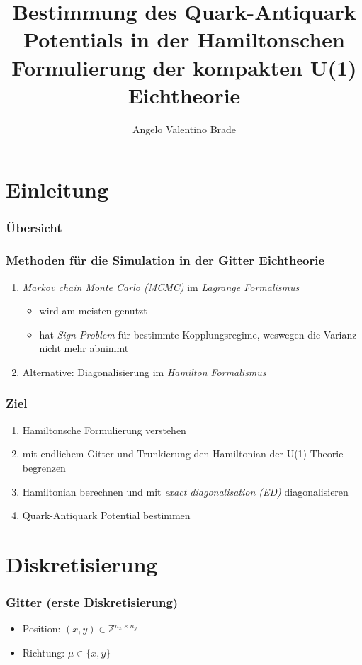 \documentclass{beamer}
\title{Bestimmung des Quark-Antiquark Potentials in der Hamiltonschen Formulierung der kompakten U(1) Eichtheorie}
\author{Angelo Valentino Brade} %
\begin{document}
\begin{frame}
	\titlepage
\end{frame}
\section{Einleitung}
\begin{frame}
	\frametitle{Übersicht}
	\begin{figure}[h]
		\center
	\end{figure}
\end{frame}

\begin{frame}
	\frametitle{Methoden für die Simulation in der Gitter Eichtheorie}
	\begin{enumerate}
		\item \textit{Markov chain Monte Carlo (MCMC)} im \textit{Lagrange Formalismus}\\
		      \begin{itemize}
			      \item wird am meisten genutzt
			      \item hat \textit{Sign Problem} für bestimmte Kopplungsregime, weswegen die Varianz nicht mehr abnimmt
		      \end{itemize}
		\item Alternative: Diagonalisierung im \textit{Hamilton Formalismus}
	\end{enumerate}
\end{frame}


\begin{frame}
	\frametitle{Ziel}
	\begin{enumerate}
		\item Hamiltonsche Formulierung verstehen
		\item mit endlichem Gitter und Trunkierung den Hamiltonian der U(1) Theorie begrenzen
		\item Hamiltonian berechnen und mit \textit{exact diagonalisation (ED)} diagonalisieren
		\item Quark-Antiquark Potential bestimmen
	\end{enumerate}
\end{frame}

\section{Diskretisierung}
\begin{frame}
	\frametitle{Gitter (erste Diskretisierung)}
			\begin{itemize}
				\item Position: $(x, y)\in\mathbb{Z}^{n_x\times n_y}$
				\item Richtung: $\mu\in \{x,y\}$
			\end{itemize}
			\begin{figure}[h]
				\begin{center}
					
				\end{center}
			\end{figure}
\end{frame}
\end{document}
